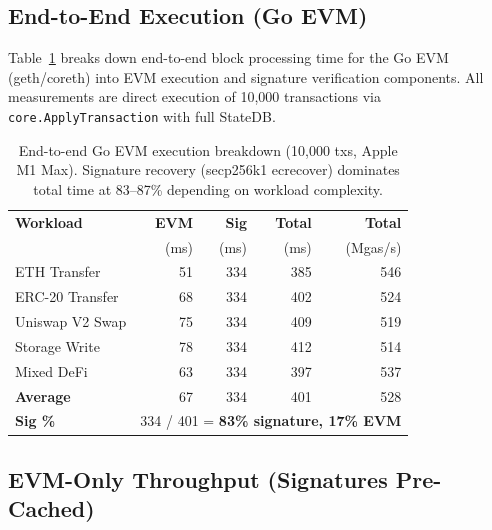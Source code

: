 \documentclass[11pt,twocolumn]{article}
\begin{document}
\subsection{End-to-End Execution (Go EVM)}

Table~\ref{tab:e2e} breaks down end-to-end block processing time for the Go EVM
(geth/coreth) into EVM execution and signature verification components. All
measurements are direct execution of 10,000 transactions via \texttt{core.ApplyTransaction}
with full StateDB.

\begin{table}[h]
\centering
\small
\begin{tabular}{lrrrr}
\toprule
\textbf{Workload} & \textbf{EVM} & \textbf{Sig} & \textbf{Total} & \textbf{Total} \\
                   & (ms)         & (ms)         & (ms)           & (Mgas/s)       \\
\midrule
ETH Transfer       & 51  & 334 & 385 & 546  \\
ERC-20 Transfer    & 68  & 334 & 402 & 524  \\
Uniswap V2 Swap    & 75  & 334 & 409 & 519  \\
Storage Write       & 78  & 334 & 412 & 514  \\
Mixed DeFi          & 63  & 334 & 397 & 537  \\
\midrule
\textbf{Average}    & 67  & 334 & 401 & 528  \\
\textbf{Sig \%}     & \multicolumn{4}{l}{334 / 401 = \textbf{83\% signature, 17\% EVM}} \\
\bottomrule
\end{tabular}
\caption{End-to-end Go EVM execution breakdown (10,000 txs, Apple M1 Max).
Signature recovery (secp256k1 ecrecover) dominates total time at 83--87\%
depending on workload complexity.}
\label{tab:e2e}
\end{table}

\subsection{EVM-Only Throughput (Signatures Pre-Cached)}
\end{document}
